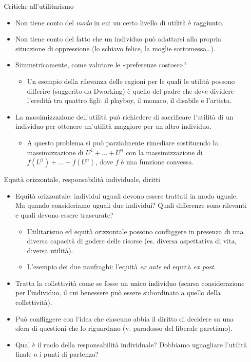 \documentclass[aspectratio=64,12pt]{beamer}
\begin{document}
\begin{frame}{Critiche all'utilitarismo}
\begin{itemize}
\item Non tiene conto del \emph{modo} in cui un certo livello di utilità è raggiunto.
\item Non tiene conto del fatto che un individuo può adattarsi alla propria
situazione di oppressione (lo schiavo felice, la moglie sottomessa\ldots{}).
\item Simmetricamente, come valutare le «preferenze costose»?
\begin{itemize}
\item Un esempio della rilevanza delle ragioni per le quali le utilità possono
  differire (suggerito da Dworking) è quello del padre che deve dividere l'eredità tra
  quattro figli: il playboy, il monaco, il disabile e l'artista.
\end{itemize}
\item La massimizzazione dell'utilità può richiedere di sacrificare l'utilità
  di un individuo per ottenere un'utilità maggiore per un altro individuo.
\begin{itemize}
\item A questo problema si può parzialmente rimediare sostituendo la
  massimizzazione di $U^1+\dots+U^n$ con la massimizzazione di
  $f(U^1)+\dots+f(U^n)$, dove $f$ è una funzione convessa.
\end{itemize}
\end{itemize}
\end{frame}

\begin{frame}{Equità orizzontale, responsabilità individuale, diritti}
\begin{itemize}
\item \alert{Equità orizzontale}: individui uguali devono essere trattati in
  modo uguale. Ma quando consideriamo uguali due individui? Quali differenze
  sono rilevanti e quali devono essere trascurate?
\begin{itemize}
\item Utilitarismo ed equità orizzontale possono confliggere in presenza di
  una diversa capacità di godere delle risorse (es. diversa aspettativa di
  vita, diversa utilità).
\item L'esempio dei due naufraghi: l'equità \emph{ex ante} ed equità \emph{ex
    post}.
\end{itemize}
\item Tratta la collettività come se fosse un unico individuo (scarsa
  considerazione per l'individuo, il cui benessere può essere subordinato a
  quello della collettività).
\item Può confliggere con l'idea che ciascuno abbia il diritto di decidere su
  una sfera di questioni che lo riguardano (v. paradosso del liberale
  paretiano).
\item Qual è il ruolo della responsabilità individuale? Dobbiamo uguagliare
  l'utilità finale o i punti di partenza?
\end{itemize}
\end{frame}
\end{document}
